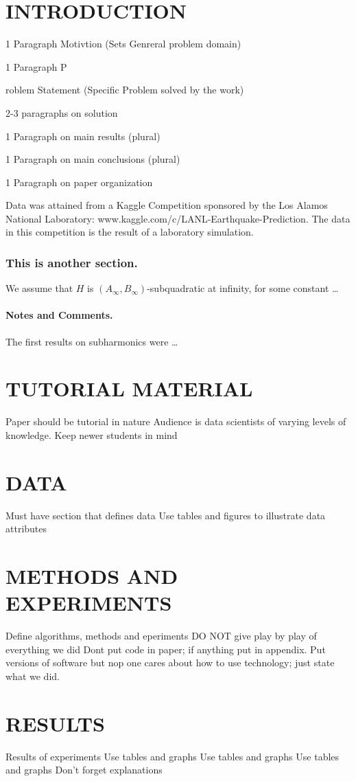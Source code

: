 \documentclass[]{llncs}
\begin{document}
\section{INTRODUCTION}
1 Paragraph Motivtion (Sets Genreral problem domain) \par
1 Paragraph P{roblem Statement (Specific Problem solved by the work) \par
2-3 paragraphs on solution \par
1 Paragraph on main results (plural) \par
1 Paragraph on main conclusions (plural) \par
1 Paragraph on paper organization \par
Data was attained from a Kaggle Competition sponsored by the Los Alamos National Laboratory:  www.kaggle.com/c/LANL-Earthquake-Prediction. The data in this competition is the result of a laboratory simulation.
\subsubsection*{This is another section.}
We assume that $H$ is $\left(A_{\infty}, B_{\infty}\right)$-subqua\-dra\-tic at infinity, for some constant \dots
\paragraph{Notes and Comments.} The first results on subharmonics were \dots
\section{TUTORIAL MATERIAL}
Paper should be tutorial in nature
Audience is data scientists of varying levels of knowledge. Keep newer students in mind
\section{DATA}
Must have section that defines data
Use tables and figures to illustrate data attributes
\section{METHODS AND EXPERIMENTS}
Define algorithms, methods and eperiments
DO NOT give play by play of everything we did
Dont put code in paper; if anything put in appendix.
Put versions of software but nop one cares about how to use technology; just state what we did.
\section{RESULTS}
Results of experiments
Use tables and graphs
Use tables and graphs
Use tables and graphs
Don't forget explanations
}
\end{document}
